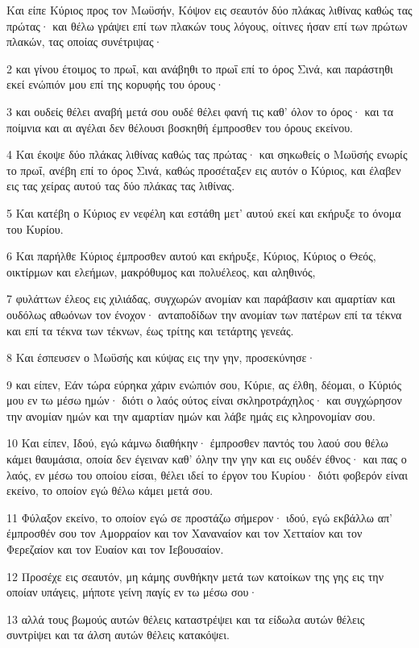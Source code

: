 \par Και είπε Κύριος προς τον Μωϋσήν, Κόψον εις σεαυτόν δύο πλάκας λιθίνας καθώς τας πρώτας· και θέλω γράψει επί των πλακών τους λόγους, οίτινες ήσαν επί των πρώτων πλακών, τας οποίας συνέτριψας·
\par 2 και γίνου έτοιμος το πρωΐ, και ανάβηθι το πρωΐ επί το όρος Σινά, και παράστηθι εκεί ενώπιόν μου επί της κορυφής του όρους·
\par 3 και ουδείς θέλει αναβή μετά σου ουδέ θέλει φανή τις καθ' όλον το όρος· και τα ποίμνια και αι αγέλαι δεν θέλουσι βοσκηθή έμπροσθεν του όρους εκείνου.
\par 4 Και έκοψε δύο πλάκας λιθίνας καθώς τας πρώτας· και σηκωθείς ο Μωϋσής ενωρίς το πρωΐ, ανέβη επί το όρος Σινά, καθώς προσέταξεν εις αυτόν ο Κύριος, και έλαβεν εις τας χείρας αυτού τας δύο πλάκας τας λιθίνας.
\par 5 Και κατέβη ο Κύριος εν νεφέλη και εστάθη μετ' αυτού εκεί και εκήρυξε το όνομα του Κυρίου.
\par 6 Και παρήλθε Κύριος έμπροσθεν αυτού και εκήρυξε, Κύριος, Κύριος ο Θεός, οικτίρμων και ελεήμων, μακρόθυμος και πολυέλεος, και αληθινός,
\par 7 φυλάττων έλεος εις χιλιάδας, συγχωρών ανομίαν και παράβασιν και αμαρτίαν και ουδόλως αθωόνων τον ένοχον· ανταποδίδων την ανομίαν των πατέρων επί τα τέκνα και επί τα τέκνα των τέκνων, έως τρίτης και τετάρτης γενεάς.
\par 8 Και έσπευσεν ο Μωϋσής και κύψας εις την γην, προσεκύνησε·
\par 9 και είπεν, Εάν τώρα εύρηκα χάριν ενώπιόν σου, Κύριε, ας έλθη, δέομαι, ο Κύριός μου εν τω μέσω ημών· διότι ο λαός ούτος είναι σκληροτράχηλος· και συγχώρησον την ανομίαν ημών και την αμαρτίαν ημών και λάβε ημάς εις κληρονομίαν σου.
\par 10 Και είπεν, Ιδού, εγώ κάμνω διαθήκην· έμπροσθεν παντός του λαού σου θέλω κάμει θαυμάσια, οποία δεν έγειναν καθ' όλην την γην και εις ουδέν έθνος· και πας ο λαός, εν μέσω του οποίου είσαι, θέλει ιδεί το έργον του Κυρίου· διότι φοβερόν είναι εκείνο, το οποίον εγώ θέλω κάμει μετά σου.
\par 11 Φύλαξον εκείνο, το οποίον εγώ σε προστάζω σήμερον· ιδού, εγώ εκβάλλω απ' έμπροσθέν σου τον Αμορραίον και τον Χαναναίον και τον Χετταίον και τον Φερεζαίον και τον Ευαίον και τον Ιεβουσαίον.
\par 12 Προσέχε εις σεαυτόν, μη κάμης συνθήκην μετά των κατοίκων της γης εις την οποίαν υπάγεις, μήποτε γείνη παγίς εν τω μέσω σου·
\par 13 αλλά τους βωμούς αυτών θέλεις καταστρέψει και τα είδωλα αυτών θέλεις συντρίψει και τα άλση αυτών θέλεις κατακόψει.
